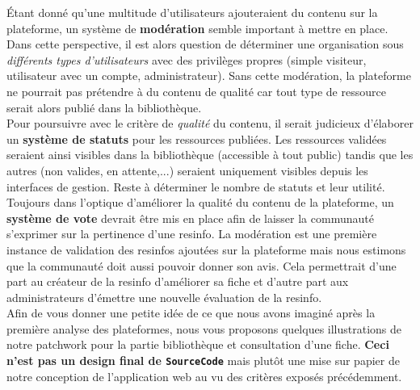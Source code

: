Étant donné qu'une multitude d'utilisateurs ajouteraient du contenu sur la plateforme, un système de \textbf{modération} semble important à mettre en place. Dans cette perspective, il est alors question de déterminer une organisation sous \textit{différents types d'utilisateurs} avec des privilèges propres (simple visiteur, utilisateur avec un compte, administrateur). Sans cette modération, la plateforme ne pourrait pas prétendre à du contenu de qualité car tout type de ressource serait alors publié dans la bibliothèque.\\

Pour poursuivre avec le critère de \textit{qualité} du contenu, il serait judicieux d'élaborer un \textbf{système de statuts} pour les ressources publiées. Les ressources validées seraient ainsi visibles dans la bibliothèque (accessible à tout public) tandis que les autres (non valides, en attente,...) seraient uniquement visibles depuis les interfaces de gestion. Reste à déterminer le nombre de statuts et leur utilité.\\

Toujours dans l'optique d'améliorer la qualité du contenu de la plateforme, un \textbf{système de vote} devrait être mis en place afin de laisser la communauté s'exprimer sur la pertinence d'une \gls{resinfo}. La modération est une première instance de validation des \glspl{resinfo} ajoutées sur la plateforme mais nous estimons que la communauté doit aussi pouvoir donner son avis. Cela permettrait d'une part au créateur de la \gls{resinfo} d'améliorer sa \gls{fiche} et d'autre part aux administrateurs d'émettre une nouvelle évaluation de la \gls{resinfo}.\\

Afin de vous donner une petite idée de ce que nous avons imaginé après la première analyse des plateformes, nous vous proposons quelques illustrations de notre patchwork pour la partie bibliothèque et consultation d'une \gls{fiche}. \textbf{Ceci n'est pas un design final de \texttt{SourceCode}} mais plutôt une mise sur papier de notre conception de l'application web au vu des critères exposés précédemment.\\

